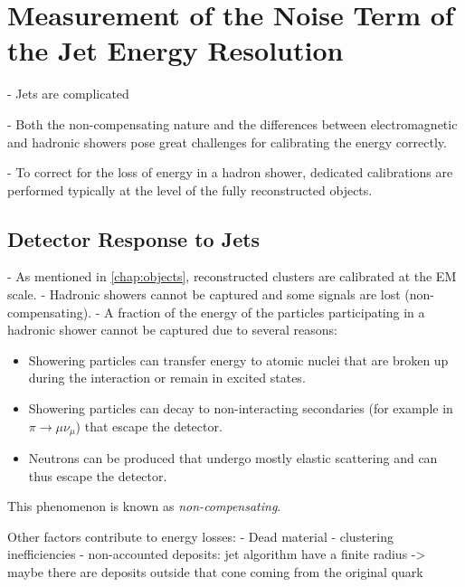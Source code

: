 \chapter{Measurement of the Noise Term of the Jet Energy Resolution}
\label{chap:calibration}

- Jets are complicated

- Both the non-compensating nature and the differences between electromagnetic and hadronic showers pose great challenges for calibrating the energy correctly.

- To correct for the loss of energy in a hadron shower, dedicated calibrations are performed typically at the level of the fully reconstructed objects.



\section{Detector Response to Jets}
- As mentioned in \cref{chap:objects}, reconstructed clusters are calibrated at the EM scale.
- Hadronic showers cannot be captured and some signals are lost (non-compensating).
- A fraction of the energy of the particles participating in a hadronic shower cannot be captured due to several reasons:
\begin{itemize}
    \item Showering particles can transfer energy to atomic nuclei that are broken up during the interaction or remain in excited states.
    \item Showering particles can decay to non-interacting secondaries (for example in $\pi \rightarrow \mu \nu_\mu$) that escape the detector.
    \item Neutrons can be produced that undergo mostly elastic scattering and can thus escape the detector.
\end{itemize}
This phenomenon is known as \emph{non-compensating}.

Other factors contribute to energy losses:
- Dead material
- clustering inefficiencies
- non-accounted deposits: jet algorithm have a finite radius -> maybe there are deposits outside that cone coming from the original quark

